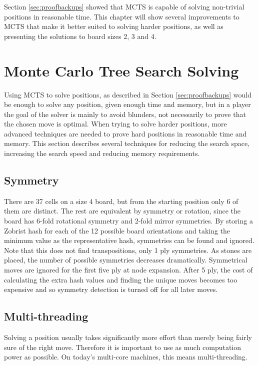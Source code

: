 


Section \ref{sec:proofbackups} showed that MCTS is capable of solving non-trivial positions in reasonable time. This chapter will show several improvements to MCTS that make it better suited to solving harder positions, as well as presenting the solutions to board sizes 2, 3 and 4.


\section{Monte Carlo Tree Search Solving}

Using MCTS to solve positions, as described in Section \ref{sec:proofbackups} would be enough to solve any position, given enough time and memory, but in a player the goal of the solver is mainly to avoid blunders, not necessarily to prove that the chosen move is optimal. When trying to solve harder positions, more advanced techniques are needed to prove hard positions in reasonable time and memory. This section describes several techniques for reducing the search space, increasing the search speed and reducing memory requirements.


\subsection{Symmetry}

There are 37 cells on a size 4 board, but from the starting position only 6 of them are distinct. The rest are equivalent by symmetry or rotation, since the board has 6-fold rotational symmetry and 2-fold mirror symmetries. By storing a Zobrist hash for each of the 12 possible board orientations and taking the minimum value as the representative hash, symmetries can be found and ignored. Note that this does not find transpositions, only 1 ply symmetries. As stones are placed, the number of possible symmetries decreases dramatically. Symmetrical moves are ignored for the first five ply at node expansion. After 5 ply, the cost of calculating the extra hash values and finding the unique moves becomes too expensive and so symmetry detection is turned off for all later moves.


\subsection{Multi-threading}

Solving a position usually takes significantly more effort than merely being fairly sure of the right move. Therefore it is important to use as much computation power as possible. On today's multi-core machines, this means multi-threading.

